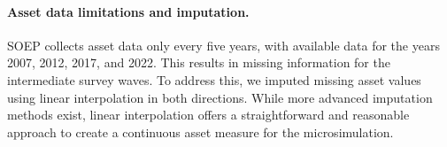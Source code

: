 \paragraph{Asset data limitations and imputation.}
SOEP collects asset data only every five years, with available data for the years 2007, 2012, 2017, and 2022. 
This results in missing information for the intermediate survey waves. 
To address this, we imputed missing asset values using linear interpolation in both directions. 
While more advanced imputation methods exist, linear interpolation offers a straightforward and reasonable approach to create a continuous asset measure for the microsimulation.
